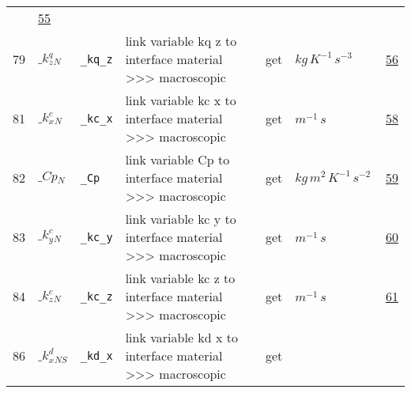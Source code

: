 \begin{longtable}{|p{1cm}|p{2.5cm}|p{4.5cm}|p{8cm}|p{3.0cm}|p{3cm}|p{1cm}|}
             &                 \hyperlink{"e:55"}{ 55 }
                 \\
            79
             & \hypertarget{"v:79"}{ $ {{\_k^q_z}}{_{N}} $}
             & \verb|_kq_z|
             & link variable kq z to interface material >>> macroscopic
             & \begin{lay}get \end{lay}
             & $ kg \,K^{-1} \,s^{-3} \, $
             &                 \hyperlink{"e:56"}{ 56 }
                 \\
            81
             & \hypertarget{"v:81"}{ $ {{\_k^c_x}}{_{N}} $}
             & \verb|_kc_x|
             & link variable kc x to interface material >>> macroscopic
             & \begin{lay}get \end{lay}
             & $ m^{-1} \,s \, $
             &                 \hyperlink{"e:58"}{ 58 }
                 \\
            82
             & \hypertarget{"v:82"}{ $ {{\_Cp}}{_{N}} $}
             & \verb|_Cp|
             & link variable Cp to interface material >>> macroscopic
             & \begin{lay}get \end{lay}
             & $ kg \,m^{2} \,K^{-1} \,s^{-2} \, $
             &                 \hyperlink{"e:59"}{ 59 }
                 \\
            83
             & \hypertarget{"v:83"}{ $ {{\_k^c_y}}{_{N}} $}
             & \verb|_kc_y|
             & link variable kc y to interface material >>> macroscopic
             & \begin{lay}get \end{lay}
             & $ m^{-1} \,s \, $
             &                 \hyperlink{"e:60"}{ 60 }
                 \\
            84
             & \hypertarget{"v:84"}{ $ {{\_k^c_z}}{_{N}} $}
             & \verb|_kc_z|
             & link variable kc z to interface material >>> macroscopic
             & \begin{lay}get \end{lay}
             & $ m^{-1} \,s \, $
             &                 \hyperlink{"e:61"}{ 61 }
                 \\
            86
             & \hypertarget{"v:86"}{ $ {{\_k^d_x}}{_{{N S}}} $}
             & \verb|_kd_x|
             & link variable kd x to interface material >>> macroscopic
             & \begin{lay}get \end{lay}

\end{longtable}
